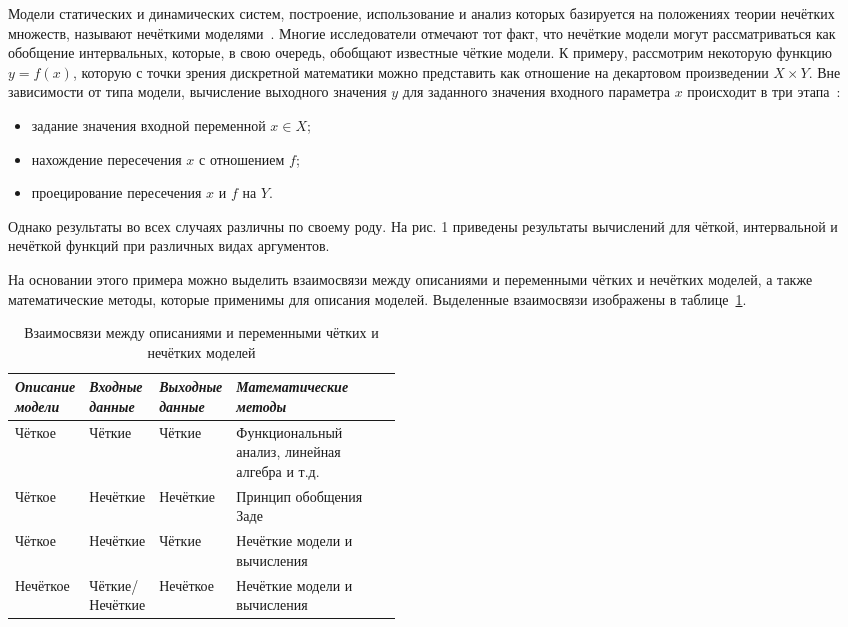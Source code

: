 
Модели статических и динамических систем, построение, использование и анализ которых базируется на положениях теории нечётких множеств, называют нечёткими моделями~\cite{Borisov_Fedulov}. Многие исследователи отмечают тот факт, что нечёткие модели могут рассматриваться как обобщение интервальных, которые, в свою очередь, обобщают известные чёткие модели. К примеру, рассмотрим некоторую функцию $y=f \left(x \right)$, которую с точки зрения дискретной математики можно представить как отношение на декартовом произведении $X \times Y$. Вне зависимости от типа модели, вычисление выходного значения $y$ для заданного значения входного параметра $x$ происходит в три этапа~\cite{Borisov_Fedulov}:
\begin{itemize}
	\item задание значения входной переменной $x \in X$;
	\item нахождение пересечения $x$ с отношением $f$;
	\item проецирование пересечения $x$ и $f$ на $Y$.
\end{itemize}

Однако результаты во всех случаях различны по своему роду. На рис. 1 приведены результаты вычислений для чёткой, интервальной и нечёткой функций при различных видах аргументов. 

На основании этого примера можно выделить взаимосвязи между описаниями и переменными чётких и нечётких моделей, а также математические методы, которые применимы для описания моделей. Выделенные взаимосвязи изображены в таблице~\ref{t:fuzzy-modeling-approaches}.
\begin{table}[H]
\caption{Взаимосвязи между описаниями и переменными чётких и нечётких моделей}
\label{t:fuzzy-modeling-approaches}
\begin{center}
\begin{tabularx}{\textwidth}{|p{0.15\linewidth}|p{0.15\linewidth}|p{0.15\linewidth}|X|}
	\hline
		\centering \textit{Описание модели} & \centering \textit{Входные данные} & \centering \textit{Выходные данные} & \centering \textit{Математические методы} \tabularnewline	\hline
	\hline
		Чёткое & Чёткие & Чёткие & Функциональный анализ, линейная алгебра и т.д. \tabularnewline
	\hline
		Чёткое & Нечёткие & Нечёткие & Принцип обобщения Заде \tabularnewline
	\hline
		Чёткое & Нечёткие & Чёткие & Нечёткие модели и вычисления \tabularnewline
	\hline
		Нечёткое & Чёткие/\allowbreak Нечёткие & Нечёткое & Нечёткие модели и вычисления \tabularnewline
  \hline
\end{tabularx}
\end{center}
\end{table}

